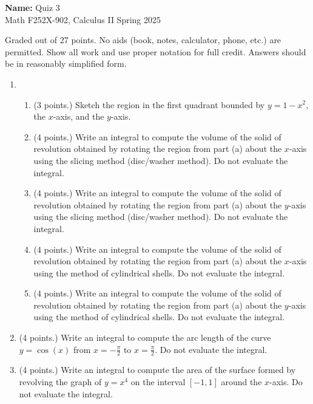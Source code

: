 \documentclass[12pt]{article}
\newcommand{\points}[1]{(#1 points.)}		%
\begin{document}
\pagestyle{plain}

\noindent \textbf{Name:} \underline{\hspace{15em}}		\hfill	Quiz 3 \\
           Math F252X-902, Calculus II  			\hfill	Spring 2025 	

                \vspace{1cm}
                
Graded out of 27 points. No aids (book, notes,
calculator, phone, etc.) are permitted. Show all work and use proper
notation for full credit. Answers should be in reasonably simplified
form.

\begin{enumerate}

\item
  \begin{enumerate}
  \item \points{3} Sketch the region in the first quadrant bounded by $y=1-x^2$, the $x$-axis, and the $y$-axis.
    \vfill
    
  \item \points{4} Write an integral to compute the volume of the
    solid of revolution obtained by rotating the region from part (a)
    about the $x$-axis using the slicing method (disc/washer
    method). Do not evaluate the integral.
    \vfill

  \item \points{4} Write an integral to compute the volume of the
    solid of revolution obtained by rotating the region from part (a)
    about the $y$-axis using the slicing method (disc/washer
    method). Do not evaluate the integral.
    \vfill

    \newpage
    
  \item \points{4} Write an integral to compute the volume of the
    solid of revolution obtained by rotating the region from part (a)
    about the $x$-axis using the method of cylindrical shells. Do not
    evaluate the integral.
    \vfill
 
  \item \points{4} Write an integral to compute the volume of the
    solid of revolution obtained by rotating the region from part (a)
    about the $y$-axis using the method of cylindrical shells. Do not
    evaluate the integral.
    \vfill
  \end{enumerate}

\item \points{4} Write an integral to compute the arc length of the
  curve $y=\cos(x)$ from $x=-\frac{\pi}{2}$ to $x=\frac{\pi}{2}$. Do
  not evaluate the integral.
  \vfill

\item \points{4} Write an integral to compute the area of the surface
  formed by revolving the graph of $y=x^4$ on the interval $[-1,1]$
  around the $x$-axis. Do not evaluate the integral.
  \vfill

\end{enumerate}
\end{document}
